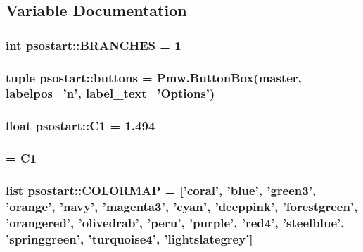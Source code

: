 \subsection{Variable Documentation}
\hypertarget{namespacepsostart_11d3269a3043128b12801302bf4d8124}{
\subsubsection{\setlength{\rightskip}{0pt plus 5cm}int {\bf psostart::BRANCHES} = 1}}
\label{namespacepsostart_11d3269a3043128b12801302bf4d8124}


\hypertarget{namespacepsostart_064c9be2d06affdbfa450b811666f684}{
\subsubsection{\setlength{\rightskip}{0pt plus 5cm}tuple {\bf psostart::buttons} = Pmw.ButtonBox({\bf master}, labelpos='n', label\_\-text='Options')}}
\label{namespacepsostart_064c9be2d06affdbfa450b811666f684}


\hypertarget{namespacepsostart_c56aa33bfc600b93a9cd5e53a40e5a74}{
\subsubsection{\setlength{\rightskip}{0pt plus 5cm}float {\bf psostart::C1} = 1.494}}
\label{namespacepsostart_c56aa33bfc600b93a9cd5e53a40e5a74}


\hypertarget{namespacepsostart_1987bb801c56c9308fe4aa22e828f42b}{
\subsubsection{ = {\bf C1}}}
\label{namespacepsostart_1987bb801c56c9308fe4aa22e828f42b}


\hypertarget{namespacepsostart_ee730049d118cbfc995e5e7f12469d3d}{
\subsubsection{\setlength{\rightskip}{0pt plus 5cm}list {\bf psostart::COLORMAP} = \mbox{[}'coral', 'blue', 'green3', 'orange', 'navy', 'magenta3', 'cyan', 'deeppink', 'forestgreen', 'orangered', 'olivedrab', 'peru', 'purple', 'red4', 'steelblue', 'springgreen', 'turquoise4', 'lightslategrey'\mbox{]}}}
\label{namespacepsostart_ee730049d118cbfc995e5e7f12469d3d}


